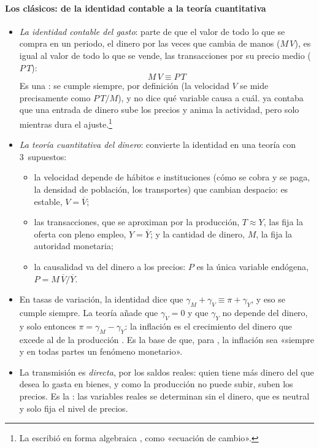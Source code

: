 \documentclass[11pt]{article}
\begin{document}
\paragraph{Los clásicos: de la identidad contable a la teoría cuantitativa}
\begin{itemize}
\item \emph{La identidad contable del gasto}: \textcite{Hume1752Money} parte de que el valor de todo lo que se compra en un periodo, el dinero por las veces que cambia de manos ($M\,V$), es igual al valor de todo lo que se vende, las transacciones por su precio medio ($P\,T$):
  \begin{equation}
  M\,V\equiv P\,T \label{eq:identidad-gasto}
  \end{equation}
  Es una : se cumple siempre, por definición (la velocidad $V$ se mide precisamente como $P\,T/M$), y no dice qué variable causa a cuál.  ya contaba que una entrada de dinero sube los precios y anima la actividad, pero solo mientras dura el ajuste.\footnote{La escribió en forma algebraica \textcite{Newcomb1885Principles}, como «ecuación de cambio».}
\item \emph{La teoría cuantitativa del dinero}: \textcite{Fisher1911Purchasing} convierte la identidad en una teoría con 3~supuestos:
  \begin{itemize}
  \item la velocidad depende de hábitos e instituciones (cómo se cobra y se paga, la densidad de población, los transportes) que cambian despacio: es estable, $V=\overline{V}$;
  \item las transacciones, que se aproximan por la producción, $T\approx Y$, las fija la oferta con pleno empleo, $Y=\overline{Y}$; y la cantidad de dinero, $M$, la fija la autoridad monetaria;
  \item la causalidad va del dinero a los precios: $P$ es la única variable endógena, $P=M\,\overline{V}/\overline{Y}$.
  \end{itemize}
\item En tasas de variación, la identidad dice que $\gamma_M+\gamma_V\equiv\pi+\gamma_Y$, y eso se cumple siempre. La teoría añade que $\gamma_V=0$ y que $\gamma_Y$ no depende del dinero, y solo entonces $\pi=\gamma_M-\gamma_Y$: la inflación es el crecimiento del dinero que excede al de la producción . Es la base de que, para \textcite{Friedman1963Inflation}, la inflación sea «siempre y en todas partes un fenómeno monetario».
\item La transmisión es \emph{directa}, por los saldos reales: quien tiene más dinero del que desea lo gasta en bienes, y como la producción no puede subir, suben los precios. Es la : las variables reales se determinan sin el dinero, que es neutral y solo fija el nivel de precios.
\end{itemize}
\end{document}
